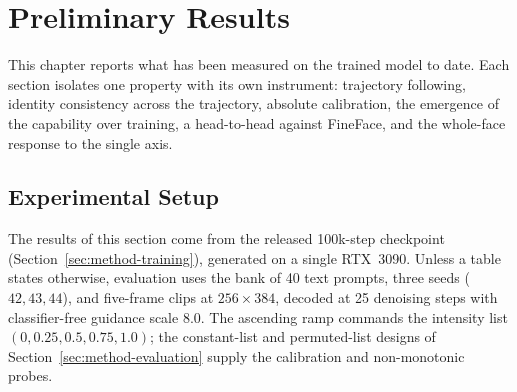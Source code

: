 \chapter{Preliminary Results}\label{cap:preliminary-results}
\glsresetall

%
%

This chapter reports what has been measured on the trained model to date. Each section
isolates one property with its own instrument: trajectory following, identity consistency across the trajectory, absolute calibration, the emergence of the capability over training, a head-to-head against FineFace, and the whole-face response to the single axis.

\section{Experimental Setup}\label{sec:res-setup}


The results of this section come from the released 100k-step checkpoint
(Section~\ref{sec:method-training}), generated on a single RTX~3090. Unless a table states
otherwise, evaluation uses the bank of 40 text prompts, three seeds ($42,43,44$), and
five-frame clips at $256\times384$, decoded at 25 denoising steps with classifier-free
guidance scale $8.0$. The ascending ramp commands the intensity list $(0,0.25,0.5,0.75,1.0)$;
the constant-list and permuted-list designs of Section~\ref{sec:method-evaluation} supply the
calibration and non-monotonic probes.


